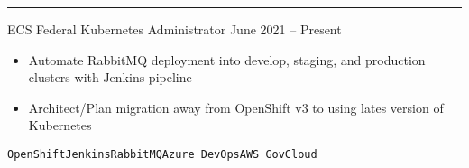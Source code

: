 \documentclass[9pt]{resume} %
\begin{document}
\begin{minipage}[t]{0.35\textwidth}

\end{minipage}
\hfill
\begin{minipage}[t]{0.6\textwidth} %
	\vspace{-\baselineskip} %




	\hrule
	\begin{entrylist}{ECS Federal}
	\entry
		{Kubernetes Administrator}
		{June 2021 -- Present}
		{{\begin{itemize}[noitemsep,topsep=0pt,leftmargin=*]
			\item Automate RabbitMQ deployment into develop, staging, and production clusters with Jenkins pipeline
			\item Architect/Plan migration away from OpenShift v3 to using lates version of Kubernetes
		\end{itemize}}		
		{\addtolength{\leftskip}{3mm}\texttt{OpenShift}\slashsep\texttt{Jenkins}\slashsep\texttt{RabbitMQ}\slashsep\texttt{Azure DevOps}\slashsep\texttt{AWS GovCloud}\par}}
	\end{entrylist}


\end{minipage}
\end{document}
